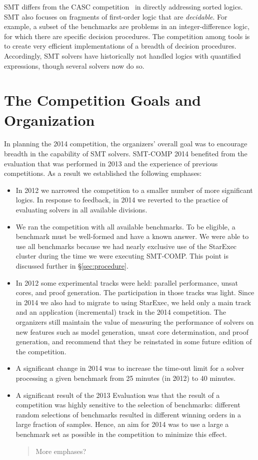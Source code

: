 \documentclass[twoside,11pt]{article}
\newcommand{\comment}[2]{\begin{quote}\sc #1\marginpar{\textcolor{red}{$\ast^{\mbox{#2}}$}}\end{quote}}
\newcommand{\davidc}[1]{\comment{#1}{DC}}
\begin{document}
SMT differs from the CASC competition~\cite{PSS02} in directly addressing sorted logics. SMT also focuses on fragments of first-order logic that are \emph{decidable}. For example, a subset of the benchmarks are problems in an integer-difference logic, for which there are specific decision procedures. The competition among tools is to create very efficient implementations of a breadth of decision procedures. Accordingly, SMT solvers have historically not handled logics with quantified expressions, though several solvers now do so.

\section{The Competition Goals and Organization}
\label{sec:goals}

In planning the 2014 competition, the organizers' overall goal was to encourage breadth
in the capability of SMT solvers. SMT-COMP 2014 benefited from the evaluation that was performed in 2013 and the experience of previous competitions. As a result we established the following emphases:
\begin{itemize}
\item In 2012 we narrowed the competition to a smaller number of more significant logics. In response to feedback, in 2014 we reverted to the practice of evaluating solvers in all available divisions.
\item We ran the competition with all available benchmarks. To be eligible, a benchmark must be well-formed and have a known answer. We were able to use all benchmarks because we had nearly exclusive use of the StarExec cluster during the time we were executing SMT-COMP. This point is discussed further in \S\ref{sec:procedure}.
\item In 2012 some experimental tracks were held: parallel performance, unsat cores, and proof generation. The participation in those tracks was light. Since in 2014 we also had to migrate to using StarExec, we held only a main track and an application (incremental) track in the 2014 competition. The organizers still maintain the value of measuring the performance of solvers on new features such as model generation, unsat core determination, and proof generation, and recommend that they be reinstated in some future edition of the competition.
\item A significant change in 2014 was to increase the time-out limit for a solver processing a given benchmark from 25 minutes (in 2012) to 40 minutes.
\item A significant result of the 2013 Evaluation was that the result of a competition was highly sensitive to the selection of benchmarks: different random selections of benchmarks resulted in different winning orders in a large fraction of samples. Hence, an aim for 2014 was to use a large a benchmark set as possible in the competition to minimize this effect.

\davidc{More emphases?}


\end{itemize}
\end{document}
